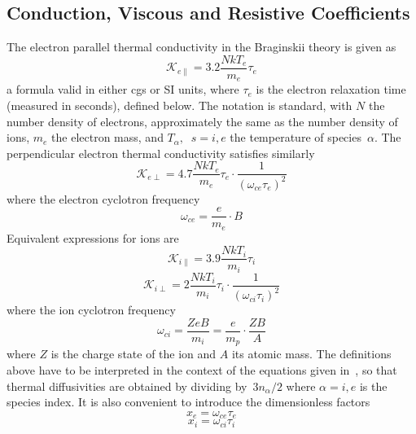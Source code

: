 \subsection{Conduction, Viscous and Resistive Coefficients}\label{sec:coefficient}
The electron parallel thermal conductivity in the Braginskii theory is given as~\cite{NRLpf07}
\begin{equation}\label{eq:kapbae}
\mathcal{K}_{e\|}= 3.2 \frac{NkT_e}{m_e} \tau_e
\end{equation}
a formula valid in either cgs or SI units, where $\tau_e$ is 
the electron relaxation time (measured in seconds), defined below.
The notation is standard, with $N$ the number density of electrons, approximately 
the same as the number density of ions, $m_e$ the electron mass, and $T_\alpha,\;\;s=i,e$
the temperature of species~$\alpha$.
The perpendicular electron thermal conductivity satisfies
similarly
\begin{equation}\label{eq:kapberpe}
\mathcal{K}_{e\perp}= 4.7 \frac{NkT_e}{m_e} \tau_e \cdot \frac{1}{(\omega_{ce}\tau_e)^2}
\end{equation}
where the electron cyclotron frequency
\begin{equation}\label{eq:cyce}
\omega_{ce}= \frac{e}{m_e}\cdot B
\end{equation}
Equivalent expressions for ions are
\begin{equation}\label{eq:kapbai}
\mathcal{K}_{i\|}= 3.9 \frac{NkT_i}{m_i} \tau_i
\end{equation}
\begin{equation}\label{eq:kapberpi}
\mathcal{K}_{i\perp}= 2 \frac{NkT_i}{m_i} \tau_i \cdot \frac{1}{(\omega_{ci}\tau_i)^2}
\end{equation}
where the ion cyclotron frequency
\begin{equation}\label{eq:cyci}
\omega_{ci}= \frac{ZeB}{m_i}= \frac{e}{m_p} \cdot \frac{ZB}{A}
\end{equation}
where $Z$ is the charge state of the ion and $A$ its atomic mass.
The definitions above have to be interpreted in the context of the
equations given in~\cite{NRLpf07}, so that thermal diffusivities are
obtained by dividing by~$3n_\alpha/2$ where $\alpha=i,e$ is the species index.
It is also convenient to introduce the dimensionless factors
\begin{equation}\label{eq:xe}
x_e= \omega_{ce}\tau_e
\end{equation}
\begin{equation}\label{eq:xi}
x_i= \omega_{ci}\tau_i
\end{equation}

